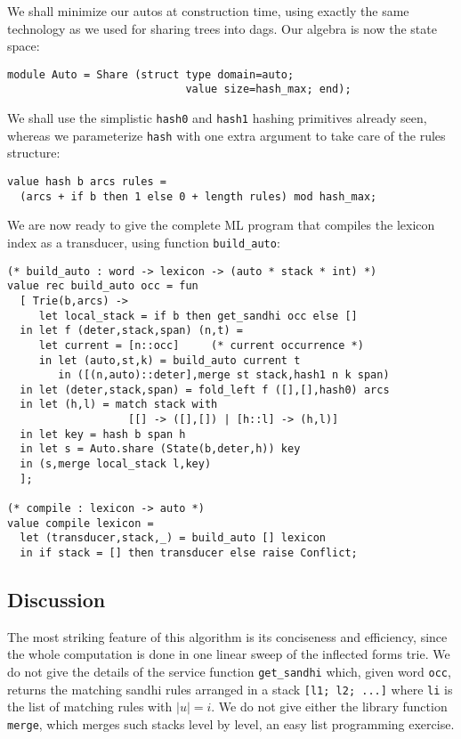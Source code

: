We shall minimize our autos at construction time, using
exactly the same technology as we used for sharing trees into dags. 
Our algebra is now the state space:

\begin{verbatim}
module Auto = Share (struct type domain=auto; 
                            value size=hash_max; end);
\end{verbatim}

We shall use the simplistic \verb:hash0: and \verb:hash1: hashing 
primitives already seen, whereas we parameterize \verb:hash: with
one extra argument to take care of the rules structure:
\begin{verbatim}
value hash b arcs rules = 
  (arcs + if b then 1 else 0 + length rules) mod hash_max;
\end{verbatim}

We are now ready to give the complete ML program that compiles the lexicon
index as a transducer, using function \verb:build_auto::

\begin{verbatim}
(* build_auto : word -> lexicon -> (auto * stack * int) *)
value rec build_auto occ = fun
  [ Trie(b,arcs) -> 
     let local_stack = if b then get_sandhi occ else []
  in let f (deter,stack,span) (n,t) = 
     let current = [n::occ]     (* current occurrence *)
     in let (auto,st,k) = build_auto current t
        in ([(n,auto)::deter],merge st stack,hash1 n k span)
  in let (deter,stack,span) = fold_left f ([],[],hash0) arcs
  in let (h,l) = match stack with
                   [[] -> ([],[]) | [h::l] -> (h,l)]
  in let key = hash b span h
  in let s = Auto.share (State(b,deter,h)) key
  in (s,merge local_stack l,key)
  ];

(* compile : lexicon -> auto *)
value compile lexicon = 
  let (transducer,stack,_) = build_auto [] lexicon 
  in if stack = [] then transducer else raise Conflict;
\end{verbatim}

\subsection{Discussion}

The most striking feature of this algorithm is its
conciseness and efficiency, since the whole computation is done in one
linear sweep of the inflected forms trie. We do not give the details of the
service function \verb|get_sandhi| which, given word \verb|occ|, returns
the matching sandhi rules arranged in a stack \verb|[l1; l2; ...]| where
\verb|li| is the list of matching rules with $\vert u\vert=i$. We do not give
either the library function \verb|merge|, which merges such stacks level 
by level, an easy list programming exercise. 

